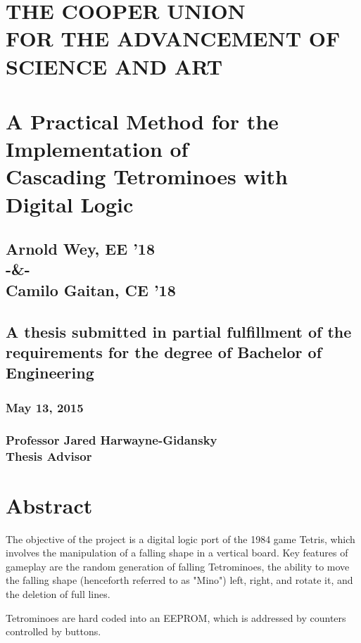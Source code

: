 \documentclass[letterpaper,titlepage,oneside]{article}
\begin{document}
\begin{center}
\section*{THE COOPER UNION \\FOR THE ADVANCEMENT OF SCIENCE AND ART\\[35pt]}
\section*{A Practical Method for the Implementation of \\Cascading Tetrominoes with Digital Logic\\[35pt]}
\subsection*{Arnold Wey, EE '18 \\[15pt]-\&-\\[15pt] Camilo Gaitan, CE '18\\[75pt]}
\subsection*{A thesis submitted in partial fulfillment of the requirements for the degree of Bachelor of Engineering\\[75pt]}
\subsubsection*{May 13, 2015\\[60pt]}
\subsubsection*{Professor Jared Harwayne-Gidansky\\[5pt]Thesis Advisor}
\end{center}
\pagebreak
\tableofcontents
\pagebreak
\section{Abstract}
The objective of the project is a digital logic port of the 1984 game Tetris, which involves the manipulation of a falling shape in a vertical board. Key features of gameplay are the random generation of falling Tetrominoes, the ability to move the falling shape (henceforth referred to as "Mino") left, right, and rotate it, and the deletion of full lines. 

Tetrominoes are hard coded into an EEPROM, which is addressed by counters controlled by buttons.
\end{document}
